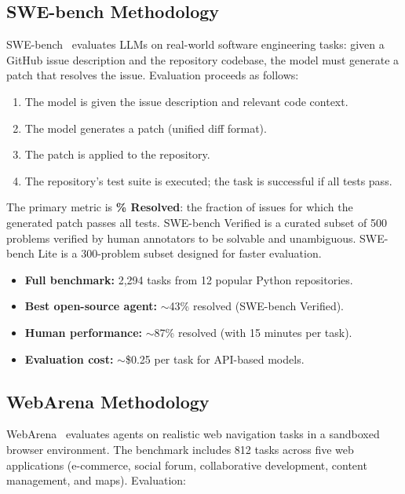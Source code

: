 \subsection{SWE-bench Methodology}
\label{swe-bench-methodology}

SWE-bench~\cite{jimenez2024swebench} evaluates LLMs on real-world software engineering tasks: given a GitHub issue description and the repository codebase, the model must generate a patch that resolves the issue. Evaluation proceeds as follows:

\begin{enumerate}
  \item The model is given the issue description and relevant code context.
  \item The model generates a patch (unified diff format).
  \item The patch is applied to the repository.
  \item The repository’s test suite is executed; the task is successful if all tests pass.
\end{enumerate}

The primary metric is \textbf{\% Resolved}: the fraction of issues for which the generated patch passes all tests. SWE-bench Verified is a curated subset of 500 problems verified by human annotators to be solvable and unambiguous. SWE-bench Lite is a 300-problem subset designed for faster evaluation.

\begin{keybox}
\begin{itemize}
  \item \textbf{Full benchmark:} 2,294 tasks from 12 popular Python repositories.
  \item \textbf{Best open-source agent:} $\sim$43\% resolved (SWE-bench Verified).
  \item \textbf{Human performance:} $\sim$87\% resolved (with 15 minutes per task).
  \item \textbf{Evaluation cost:} $\sim$\$0.25 per task for API-based models.
\end{itemize}
\end{keybox}

\subsection{WebArena Methodology}
\label{webarena-methodology}

WebArena~\cite{zhou2024webarena} evaluates agents on realistic web navigation tasks in a sandboxed browser environment. The benchmark includes 812 tasks across five web applications (e-commerce, social forum, collaborative development, content management, and maps). Evaluation:


